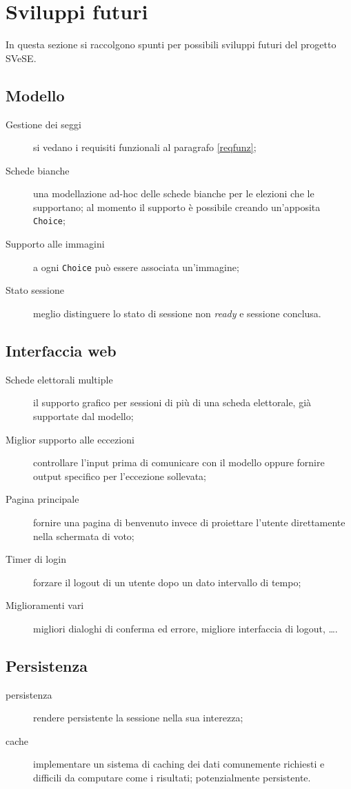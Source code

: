 \section{Sviluppi futuri}
In questa sezione si raccolgono spunti per possibili sviluppi futuri del progetto SVeSE.


\subsection{Modello}
\begin{description}
	\item[Gestione dei seggi] si vedano i requisiti funzionali al paragrafo \ref{reqfunz};
	\item[Schede bianche] una modellazione ad-hoc delle schede bianche per le elezioni che le supportano; al momento il supporto è possibile creando un'apposita \verb!Choice!;
	\item[Supporto alle immagini] a ogni \verb!Choice! può essere associata un'immagine;
	\item[Stato sessione] meglio distinguere lo stato di sessione non \emph{ready} e sessione conclusa.
\end{description}


\subsection{Interfaccia web}
\begin{description}
	\item[Schede elettorali multiple] il supporto grafico per sessioni di più di una scheda elettorale, già supportate dal modello;
	\item[Miglior supporto alle eccezioni] controllare l'input prima di comunicare con il modello oppure fornire output specifico per l'eccezione sollevata;
	\item[Pagina principale] fornire una pagina di benvenuto invece di proiettare l'utente direttamente nella schermata di voto;
	\item[Timer di login] forzare il logout di un utente dopo un dato intervallo di tempo;
	\item[Miglioramenti vari] migliori dialoghi di conferma ed errore, migliore interfaccia di logout, \dots.
\end{description}


\subsection{Persistenza}
\begin{description}
	\item[persistenza] rendere persistente la sessione nella sua interezza;
	\item[cache] implementare un sistema di caching dei dati comunemente richiesti e difficili da computare come i risultati; potenzialmente persistente.
\end{description}




